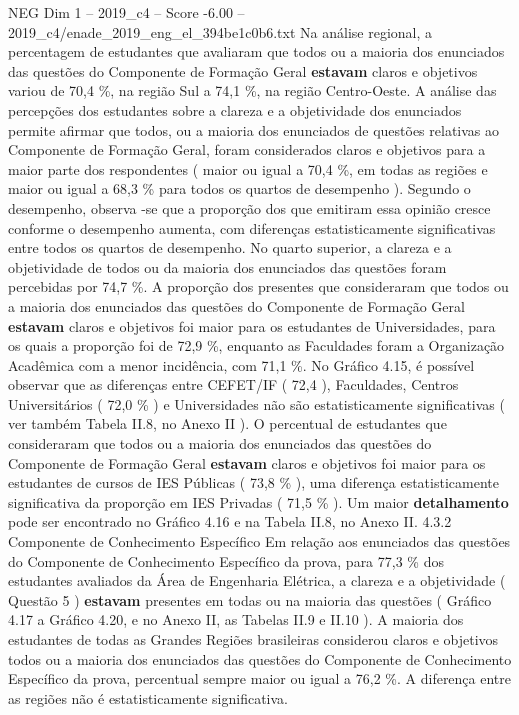 \begin{textsample}{NEG Dim 1 – 2019\_c4 – Score -6.00 – 2019\_c4/enade\_2019\_eng\_el\_394be1c0b6.txt}
Na análise regional, a percentagem de estudantes que avaliaram que todos ou a maioria dos enunciados das questões do Componente de Formação Geral \textbf{estavam} claros e objetivos variou de 70,4 \%, na região Sul a 74,1 \%, na região Centro-Oeste.
A análise das percepções dos estudantes sobre a clareza e a objetividade dos enunciados permite afirmar que todos, ou a maioria dos enunciados de questões relativas ao Componente de Formação Geral, foram considerados claros e objetivos para a maior parte dos respondentes ( maior ou igual a 70,4 \%, em todas as regiões e maior ou igual a 68,3 \% para todos os quartos de desempenho ).
Segundo o desempenho, observa -se que a proporção dos que emitiram essa opinião cresce conforme o desempenho aumenta, com diferenças estatisticamente significativas entre todos os quartos de desempenho.
No quarto superior, a clareza e a objetividade de todos ou da maioria dos enunciados das questões foram percebidas por 74,7 \%.
A proporção dos presentes que consideraram que todos ou a maioria dos enunciados das questões do Componente de Formação Geral \textbf{estavam} claros e objetivos foi maior para os estudantes de Universidades, para os quais a proporção foi de 72,9 \%, enquanto as Faculdades foram a Organização Acadêmica com a menor incidência, com 71,1 \%.
No Gráfico 4.15, é possível observar que as diferenças entre CEFET/IF ( 72,4 ), Faculdades, Centros Universitários ( 72,0 \% ) e Universidades não são estatisticamente significativas ( ver também Tabela II.8, no Anexo II ).
O percentual de estudantes que consideraram que todos ou a maioria dos enunciados das questões do Componente de Formação Geral \textbf{estavam} claros e objetivos foi maior para os estudantes de cursos de IES Públicas ( 73,8 \% ), uma diferença estatisticamente significativa da proporção em IES Privadas ( 71,5 \% ).
Um maior \textbf{detalhamento} pode ser encontrado no Gráfico 4.16 e na Tabela II.8, no Anexo II. 4.3.2 Componente de Conhecimento Específico Em relação aos enunciados das questões do Componente de Conhecimento Específico da prova, para 77,3 \% dos estudantes avaliados da Área de Engenharia Elétrica, a clareza e a objetividade ( Questão 5 ) \textbf{estavam} presentes em todas ou na maioria das questões ( Gráfico 4.17 a Gráfico 4.20, e no Anexo II, as Tabelas II.9 e II.10 ).
A maioria dos estudantes de todas as Grandes Regiões brasileiras considerou claros e objetivos todos ou a maioria dos enunciados das questões do Componente de Conhecimento Específico da prova, percentual sempre maior ou igual a 76,2 \%.
A diferença entre as regiões não é estatisticamente significativa.

\end{textsample}
